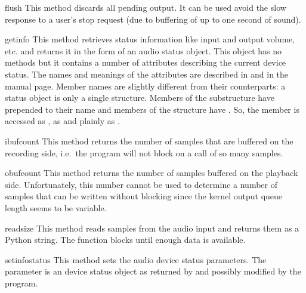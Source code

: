 \begin{methoddesc}{flush}{}
This method discards all pending output. It can be used avoid the
slow response to a user's stop request (due to buffering of up to one
second of sound).
\end{methoddesc}

\begin{methoddesc}{getinfo}{}
This method retrieves status information like input and output volume,
etc. and returns it in the form of
an audio status object. This object has no methods but it contains a
number of attributes describing the current device status. The names
and meanings of the attributes are described in
 and in the 
manual page.  Member names
are slightly different from their \C{} counterparts: a status object is
only a single structure. Members of the  substructure have
 prepended to their name and members of the 
structure have . So, the \C{} member  is
accessed as ,  as 
and  plainly as .
\end{methoddesc}

\begin{methoddesc}{ibufcount}{}
This method returns the number of samples that are buffered on the
recording side, i.e.\ the program will not block on a
 call of so many samples.
\end{methoddesc}

\begin{methoddesc}{obufcount}{}
This method returns the number of samples buffered on the playback
side. Unfortunately, this number cannot be used to determine a number
of samples that can be written without blocking since the kernel
output queue length seems to be variable.
\end{methoddesc}

\begin{methoddesc}{read}{size}
This method reads  samples from the audio input and returns
them as a Python string. The function blocks until enough data is available.
\end{methoddesc}

\begin{methoddesc}{setinfo}{status}
This method sets the audio device status parameters. The 
parameter is an device status object as returned by  and
possibly modified by the program.
\end{methoddesc}

